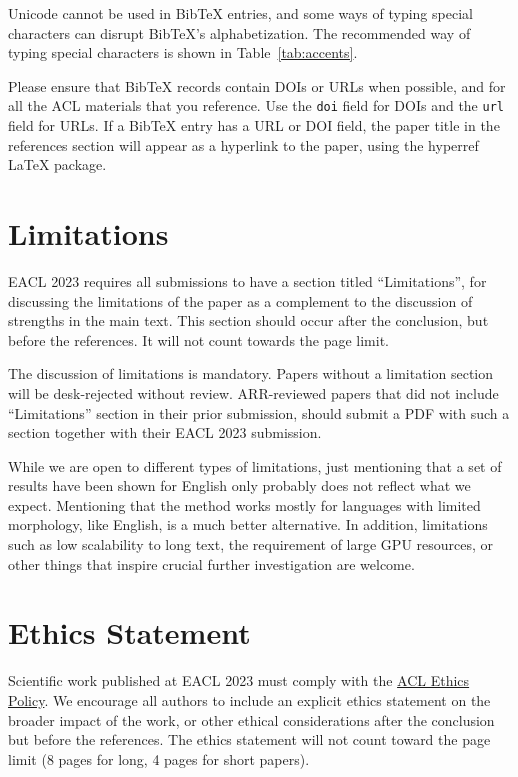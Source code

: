 \documentclass[11pt]{article}
\begin{document}
Unicode cannot be used in Bib\TeX{} entries, and some ways of typing special characters can disrupt Bib\TeX's alphabetization. The recommended way of typing special characters is shown in Table~\ref{tab:accents}.

Please ensure that Bib\TeX{} records contain DOIs or URLs when possible, and for all the ACL materials that you reference.
Use the \verb|doi| field for DOIs and the \verb|url| field for URLs.
If a Bib\TeX{} entry has a URL or DOI field, the paper title in the references section will appear as a hyperlink to the paper, using the hyperref \LaTeX{} package.

\section*{Limitations}
EACL 2023 requires all submissions to have a section titled ``Limitations'', for discussing the limitations of the paper as a complement to the discussion of strengths in the main text. This section should occur after the conclusion, but before the references. It will not count towards the page limit.

The discussion of limitations is mandatory. Papers without a limitation section will be desk-rejected without review.
ARR-reviewed papers that did not include ``Limitations'' section in their prior submission, should submit a PDF with such a section together with their EACL 2023 submission.

While we are open to different types of limitations, just mentioning that a set of results have been shown for English only probably does not reflect what we expect. 
Mentioning that the method works mostly for languages with limited morphology, like English, is a much better alternative.
In addition, limitations such as low scalability to long text, the requirement of large GPU resources, or other things that inspire crucial further investigation are welcome.

\section*{Ethics Statement}
Scientific work published at EACL 2023 must comply with the \href{https://www.aclweb.org/portal/content/acl-code-ethics}{ACL Ethics Policy}. We encourage all authors to include an explicit ethics statement on the broader impact of the work, or other ethical considerations after the conclusion but before the references. The ethics statement will not count toward the page limit (8 pages for long, 4 pages for short papers).
\end{document}
